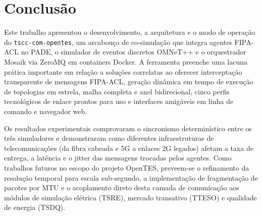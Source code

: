 \documentclass[10pt,twocolumn,a4paper]{article}
\begin{document}
\section{Conclusão}

Este trabalho apresentou o desenvolvimento, a arquitetura e o modo de operação do \texttt{tscc-com-opentes}, um arcabouço de co-simulação que integra agentes FIPA-ACL no PADE, o simulador de eventos discretos OMNeT++ e o orquestrador Mosaik via ZeroMQ em containers Docker. A ferramenta preenche uma lacuna prática importante em relação a soluções correlatas ao oferecer interceptação transparente de mensagens FIPA-ACL, geração dinâmica em tempo de execução de topologias em estrela, malha completa e anel bidirecional, cinco perfis tecnológicos de enlace prontos para uso e interfaces amigáveis em linha de comando e navegador web.

Os resultados experimentais comprovaram o sincronismo determinístico entre os três simuladores e demonstraram como diferentes infraestruturas de telecomunicações (da fibra cabeada e 5G a enlaces 2G legados) afetam a taxa de entrega, a latência e o jitter das mensagens trocadas pelos agentes. Como trabalhos futuros no escopo do projeto OpenTES, preveem-se o refinamento da resolução temporal para escala sub-segundo, a implementação de fragmentação de pacotes por MTU e o acoplamento direto desta camada de comunicação aos módulos de simulação elétrica (TSRE), mercado transativo (TTESO) e qualidade de energia (TSDQ).
\end{document}
